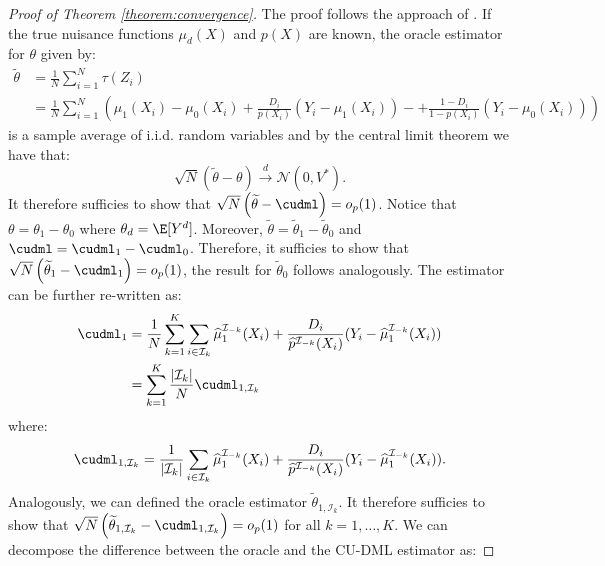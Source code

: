 \begin{appendix}
\begin{proof}[Proof of Theorem \ref{theorem:convergence}]
    The proof follows the approach of \cite{Wager2022}. If the true nuisance functions $\mu_d(X)$ and $p(X)$ are known, the oracle estimator for $\theta$ given by:
    \begin{align*}
        \widetilde{\theta} &= \frac{1}{N} \sum_{i=1}^N \tau(Z_i)\\
        &= \frac{1}{N} \sum_{i=1}^N \left(\mu_1(X_i) - \mu_0(X_i) + \frac{D_i}{p(X_i)}(Y_i - \mu_1(X_i)) - + \frac{1-D_i}{1-p(X_i)}(Y_i - \mu_0(X_i)) \right) 
    \end{align*}
    is a sample average of i.i.d. random variables and by the central limit theorem we have that:
    \begin{equation*}
        \sqrt{N}\left(\widetilde{\theta} - \theta \right) \overset{d}{\longrightarrow} \mathcal{N}\left(0, V^*\right).
    \end{equation*}
    It therefore sufficies to show that $\sqrt{N}\left(\widetilde{\theta} - \cudml \right) = o_p(1)$. Notice that $\theta = \theta_1 - \theta_0$ where $\theta_d = \E[Y^d]$. Moreover, $\widetilde{\theta} = \widetilde{\theta}_1 - \widetilde{\theta}_0$ and $\cudml = \cudml_1 - \cudml_0$. Therefore, it sufficies to show that $\sqrt{N}\left(\widetilde{\theta}_1 - \cudml_1 \right) = o_p(1)$, the result for $\widetilde{\theta}_0$ follows analogously. The estimator can be further re-written as:
    \begin{align*}
        \cudml_1 &= \frac{1}{N}\sum_{k=1}^{K} \sum_{i\in\mathcal{I}_k} \widehat\mu^{\mathcal{I}_{-k}}_1(X_i) + \frac{D_i}{\widehat{p}^{\mathcal{I}_{-k}}(X_i)}(Y_i-\widehat\mu^{\mathcal{I}_{-k}}_1(X_i))\\
        &= \sum_{k=1}^{K} \frac{\vert \mathcal{I}_k \vert}{N} \cudml_{1,\mathcal{I}_k}
    \end{align*}
    where:
    \begin{equation*}
        \cudml_{1,\mathcal{I}_k} = \frac{1}{\vert \mathcal{I}_k \vert} \sum_{i\in\mathcal{I}_k} \widehat\mu^{\mathcal{I}_{-k}}_1(X_i) + \frac{D_i}{\widehat{p}^{\mathcal{I}_{-k}}(X_i)}(Y_i-\widehat\mu^{\mathcal{I}_{-k}}_1(X_i)).
    \end{equation*}
    Analogously, we can defined the oracle estimator $\widetilde{\theta}_{1,\mathcal{I}_k}$. It therefore sufficies to show that $\sqrt{N}\left(\widetilde{\theta}_{1,\mathcal{I}_k} - \cudml_{1,\mathcal{I}_k} \right) = o_p(1)$ for all $k=1,\dots,K$. We can decompose the difference between the oracle and the CU-DML estimator as:

\end{proof}
\end{appendix}
